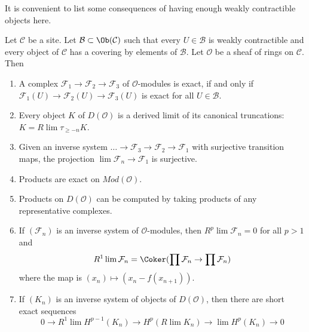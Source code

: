 \noindent
It is convenient to list some consequences of having enough
weakly contractible objects here.

\begin{proposition}
\label{proposition-enough-weakly-contractibles}
Let $\mathcal{C}$ be a site. Let $\mathcal{B} \subset \Ob(\mathcal{C})$
such that every $U \in \mathcal{B}$ is weakly contractible and
every object of $\mathcal{C}$ has a covering by elements of $\mathcal{B}$.
Let $\mathcal{O}$ be a sheaf of rings on $\mathcal{C}$. Then
\begin{enumerate}
\item A complex $\mathcal{F}_1 \to \mathcal{F}_2 \to \mathcal{F}_3$
of $\mathcal{O}$-modules is exact, if and only if
$\mathcal{F}_1(U) \to \mathcal{F}_2(U) \to \mathcal{F}_3(U)$
is exact for all $U \in \mathcal{B}$.
\item Every object $K$ of $D(\mathcal{O})$ is a derived limit
of its canonical truncations: $K = R\lim \tau_{\geq -n} K$.
\item Given an inverse system
$\ldots \to \mathcal{F}_3 \to \mathcal{F}_2 \to \mathcal{F}_1$
with surjective transition maps, the projection
$\lim \mathcal{F}_n \to \mathcal{F}_1$ is surjective.
\item Products are exact on $\textit{Mod}(\mathcal{O})$.
\item Products on $D(\mathcal{O})$ can be computed by taking
products of any representative complexes.
\item If $(\mathcal{F}_n)$ is an inverse system of $\mathcal{O}$-modules,
then $R^p\lim \mathcal{F}_n = 0$ for all $p > 1$ and
$$
R^1\lim \mathcal{F}_n  =
\Coker(\prod \mathcal{F}_n \to \prod \mathcal{F}_n)
$$
where the map is $(x_n) \mapsto (x_n - f(x_{n + 1}))$.
\item If $(K_n)$ is an inverse system of objects of $D(\mathcal{O})$,
then there are short exact sequences
$$
0 \to R^1\lim H^{p - 1}(K_n) \to H^p(R\lim K_n) \to
\lim H^p(K_n) \to 0
$$
\end{enumerate}
\end{proposition}

